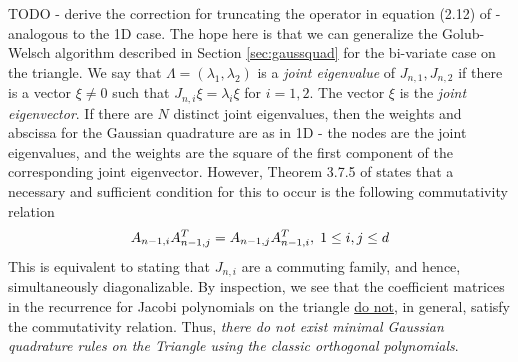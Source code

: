 TODO - derive the correction for truncating the operator in equation (2.12) of \cite{sparsetri} - analogous to the 1D case.
The hope here is that we can generalize the Golub-Welsch algorithm described in Section \ref{sec:gaussquad} for the bi-variate case on the triangle. We say that $\Lambda = (\lambda_1,\lambda_2)$ is a  \emph{joint eigenvalue} of $J_{n,1},J_{n,2}$ if there is a vector $\xi \neq 0$ such that $J_{n,i}\xi = \lambda_i \xi$ for $i=1,2$. The vector $\xi$ is the \emph{joint eigenvector}. If there are $N$ distinct joint eigenvalues, then the weights and abscissa for the Gaussian quadrature are as in 1D - the nodes are the joint eigenvalues, and the weights are the square of the first component of the corresponding joint eigenvector. However, Theorem 3.7.5 of \cite{dunkl_xu} states that a necessary and sufficient condition for this to occur is the following commutativity relation
\begin{equation}
	A_{n-1,i}A_{n-1,j}^T = A_{n-1,j}A_{n-1,i}^T,\; 1 \leq i,j\leq d
\end{equation}
This is equivalent to stating that $J_{n,i}$ are a commuting family, and hence, simultaneously diagonalizable. By inspection, we see that the coefficient matrices in the recurrence for Jacobi polynomials on the triangle \underline{do not}, in general, satisfy the commutativity relation. Thus, \emph{there do not exist minimal Gaussian quadrature rules on the Triangle using the classic orthogonal polynomials}.

